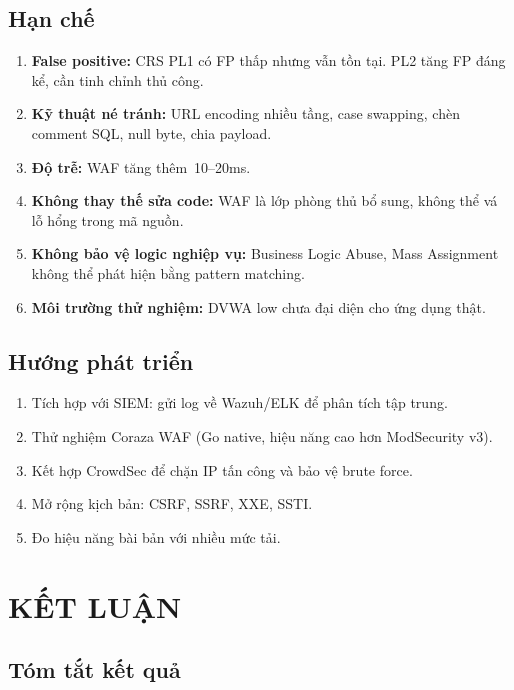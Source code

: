 \documentclass[12pt,a4paper,twoside]{report}
\begin{document}
\section{Hạn chế}

\begin{enumerate}
    \item \textbf{False positive:} CRS PL1 có FP thấp nhưng vẫn tồn tại. PL2 tăng FP đáng kể, cần tinh chỉnh thủ công.
    \item \textbf{Kỹ thuật né tránh:} URL encoding nhiều tầng, case swapping, chèn comment SQL, null byte, chia payload.
    \item \textbf{Độ trễ:} WAF tăng thêm~10--20ms.
    \item \textbf{Không thay thế sửa code:} WAF là lớp phòng thủ bổ sung, không thể vá lỗ hổng trong mã nguồn.
    \item \textbf{Không bảo vệ logic nghiệp vụ:} Business Logic Abuse, Mass Assignment không thể phát hiện bằng pattern matching.
    \item \textbf{Môi trường thử nghiệm:} DVWA low chưa đại diện cho ứng dụng thật.
\end{enumerate}

\section{Hướng phát triển}

\begin{enumerate}
    \item Tích hợp với SIEM: gửi log về Wazuh/ELK để phân tích tập trung.
    \item Thử nghiệm Coraza WAF (Go native, hiệu năng cao hơn ModSecurity v3).
    \item Kết hợp CrowdSec để chặn IP tấn công và bảo vệ brute force.
    \item Mở rộng kịch bản: CSRF, SSRF, XXE, SSTI.
    \item Đo hiệu năng bài bản với nhiều mức tải.
\end{enumerate}

\chapter{KẾT LUẬN}

\section{Tóm tắt kết quả}
\end{document}

